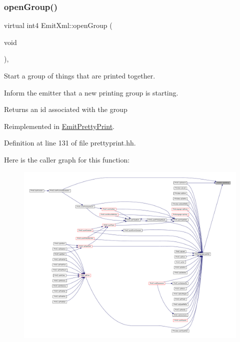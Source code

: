 \subsubsection{\texorpdfstring{openGroup()}{openGroup()}}
{\footnotesize\ttfamily virtual int4 Emit\+Xml\+::open\+Group (\begin{DoxyParamCaption}\item[{void}]{ }\end{DoxyParamCaption})\hspace{0.3cm}{\ttfamily [inline]}, {\ttfamily [virtual]}}



Start a group of things that are printed together. 

Inform the emitter that a new printing group is starting. \begin{DoxyReturn}{Returns}
an id associated with the group 
\end{DoxyReturn}


Reimplemented in \mbox{\hyperlink{class_emit_pretty_print_aebc625908acafdfead7424ea48d53ce1}{Emit\+Pretty\+Print}}.



Definition at line 131 of file prettyprint.\+hh.

Here is the caller graph for this function\+:
\nopagebreak
\begin{figure}[H]
\begin{center}
\leavevmode
\includegraphics[width=350pt]{class_emit_xml_a7f370f4d245182bc6132885a0e8b4d71_icgraph}
\end{center}
\end{figure}
\mbox{\label{class_emit_xml_a4f7e781436dde8754ae5f52c9c5edc47}} 
